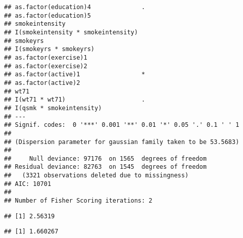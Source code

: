 \documentclass[10pt,]{book}
\newenvironment{Shaded}{\begin{snugshade}}{\end{snugshade}}
\newcommand{\CommentTok}[1]{\textcolor[rgb]{0.56,0.35,0.01}{\textit{#1}}}
\newcommand{\DecValTok}[1]{\textcolor[rgb]{0.00,0.00,0.81}{#1}}
\newcommand{\KeywordTok}[1]{\textcolor[rgb]{0.13,0.29,0.53}{\textbf{#1}}}
\newcommand{\NormalTok}[1]{#1}
\newcommand{\OperatorTok}[1]{\textcolor[rgb]{0.81,0.36,0.00}{\textbf{#1}}}
\newcommand{\StringTok}[1]{\textcolor[rgb]{0.31,0.60,0.02}{#1}}
\begin{document}
\begin{verbatim}
## as.factor(education)4              .  
## as.factor(education)5                 
## smokeintensity                        
## I(smokeintensity * smokeintensity)    
## smokeyrs                              
## I(smokeyrs * smokeyrs)                
## as.factor(exercise)1                  
## as.factor(exercise)2                  
## as.factor(active)1                 *  
## as.factor(active)2                    
## wt71                                  
## I(wt71 * wt71)                     .  
## I(qsmk * smokeintensity)              
## ---
## Signif. codes:  0 '***' 0.001 '**' 0.01 '*' 0.05 '.' 0.1 ' ' 1
## 
## (Dispersion parameter for gaussian family taken to be 53.5683)
## 
##     Null deviance: 97176  on 1565  degrees of freedom
## Residual deviance: 82763  on 1545  degrees of freedom
##   (3321 observations deleted due to missingness)
## AIC: 10701
## 
## Number of Fisher Scoring iterations: 2
\end{verbatim}

\begin{Shaded}
\end{Shaded}

\begin{verbatim}
## [1] 2.56319
\end{verbatim}

\begin{Shaded}
\end{Shaded}

\begin{verbatim}
## [1] 1.660267
\end{verbatim}
\end{document}
